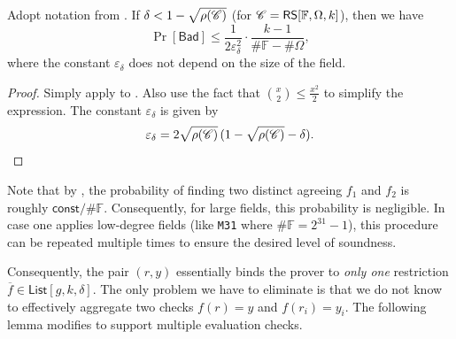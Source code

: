 \documentclass[../../book]{subfiles}
\begin{document}
\begin{corollary}\label{cor:iopp-bad-event}
  Adopt notation from . 
  If $\delta < 1-\sqrt{\rho(\mathscr{C})}$ (for $\mathscr{C}=\mathsf{RS}[\mathbb{F},\Omega,k]$), then we have
    \begin{equation*}
      \Pr\left[ \mathsf{Bad} \right] \leq \frac{1}{2\varepsilon_{\delta}^2} \cdot \frac{k-1}{\#\mathbb{F} - \#\Omega},
    \end{equation*}
    where the constant $\varepsilon_{\delta}$ does not depend on the size of the field.
\end{corollary}

\begin{proof}
  Simply apply  to . 
  Also use the fact that $\binom{x}{2} \leq \frac{x^2}{2}$ to simplify the expression.
  The constant $\varepsilon_{\delta}$ is given by 
  \begin{equation*}
    \varepsilon_{\delta} = 2\sqrt{\rho(\mathscr{C})}\,(1-\sqrt{\rho(\mathscr{C})}-\delta).
  \end{equation*}
\end{proof}

\begin{remark}
  Note that by , the probability of finding two distinct agreeing $f_1$ and $f_2$ is roughly $\mathsf{const}/\#\mathbb{F}$.
  Consequently, for large fields, this probability is negligible.
  In case one applies low-degree fields (like \texttt{M31} where $\#\mathbb{F} = 2^{31}-1$), this procedure can be repeated multiple times to ensure the desired level of soundness.
\end{remark}

Consequently, the pair $(r,y)$ essentially binds the prover to \emph{only one} restriction $\overline{f} \in \mathsf{List}[g,k,\delta]$.
The only problem we have to eliminate is that we do not know to effectively aggregate two checks $f(r)=y$ and $f(r_i)=y_i$.
The following lemma modifies  to support multiple evaluation checks.
\end{document}
